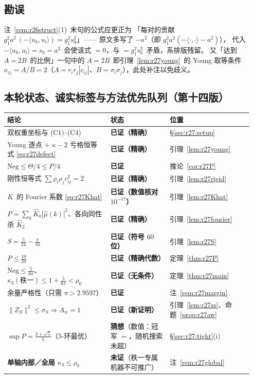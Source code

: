 \subsection{勘误}\label{sec:r27:erratum}

注~\ref{rem:r26struct}(1)~末句的公式应更正为
「每对的贡献 $g_1^2a^2\,(-\langle u_k,u_l\rangle)=g_1^2s_0^2$」——
原文多写了 $-a^2$（即 $g_1^2a^2(-\langle\cdot,\cdot\rangle-a^2)$），
代入 $-\langle u_k,u_l\rangle=s_0=a^2$~会使该式 $=0$，与 $=g_1^2s_0^2$~矛盾，系排版残留。
又「达到 $A=2B$~的比例」一句中的 $A=2B$~即引理~\ref{lem:r27young}~的 Young 取等条件
$\kappa_{ij}=A/B=2$（$A=r_ir_j|c_{ij}|$、$B=\sigma_i\sigma_j$），此处补注以免歧义。

\subsection{本轮状态、诚实标签与方法优先队列（第十四版）}\label{sec:r27:status}

\begin{center}\small
\begin{tabular}{lll}
\toprule
结论 & 状态 & 位置\\
\midrule
双权重坐标与 (C1)--(C4) & \textbf{已证（精确）} & \S\ref{sec:r27:setup}\\
Young 逐点 $+$ $\kappa-2$ 亏格恒等式 \eqref{eq:r27defect} & \textbf{已证（精确）} & 引理~\ref{lem:r27young}\\
$\mathrm{Neg}\le\Theta/4\le P/4$ & \textbf{已证} & 推论~\ref{cor:r27P}\\
刚性恒等式 $\sum\rho_i\rho_jc_{ij}^2=2$ & \textbf{已证（精确）} & 引理~\ref{lem:r27rigid}\\
$K$~的 Fourier 系数 \eqref{eq:r27Khat} & \textbf{已证（数值核对 $10^{-17}$）} & 引理~\ref{lem:r27Khat}\\
$P=\sum_k\widehat K_k|\widehat\mu(k)|^2$、各向同性杀 $\widehat K_2$ & \textbf{已证（精确）} & 引理~\ref{lem:r27fourier}\\
$S=\frac5{24}-\frac\pi{16}$ & \textbf{已证（符号 $60$ 位）} & 引理~\ref{lem:r27S}\\
$P\le\frac{10}{3\pi}$ & \textbf{已证（精确代数）} & 定理~\ref{thm:r27P}\\
$\mathrm{Neg}\le\frac5{6\pi}$、$\kappa_3(\text{秩一})\le1+\frac5{6\pi}<\rho_0$ & \textbf{已证（无条件）} & 定理~\ref{thm:r27main}\\
余量严格性（只需 $\pi>2.9597$） & \textbf{已证} & 注~\ref{rem:r27margin}\\
$\|Z_S\|^2\le\sigma_S\Rightarrow A_w=1$ & \textbf{已证（新证明）} & 引理~\ref{lem:r27zs}、命题~\ref{prop:r27aw}\\
$\sup P=\frac{3+\sqrt5}5$（$5$-环最优） & \textbf{猜想}（数值：冠军 $=$，随机搜索未超） & \S\ref{sec:r27:tight}(i)\\
\textbf{单轴内部／全局 $\kappa_3\le\rho_0$} & \textbf{未证}（秩一专属机器不可推广） & 注~\ref{rem:r27global}\\
\bottomrule
\end{tabular}
\end{center}

